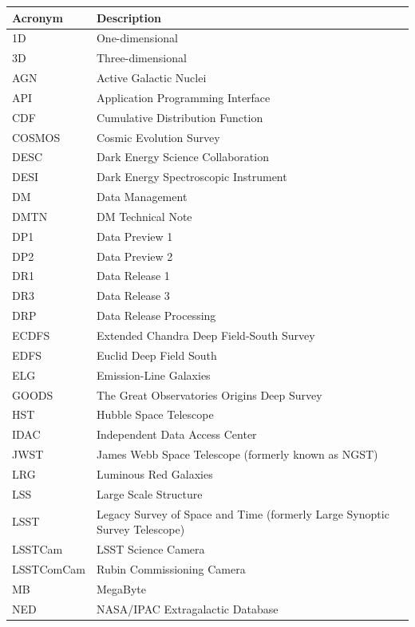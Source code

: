 \addtocounter{table}{-1}
\begin{longtable}{p{}p{}}\hline
\textbf{Acronym} & \textbf{Description}  \\\hline

1D & One-dimensional \\\hline
3D & Three-dimensional \\\hline
AGN & Active Galactic Nuclei \\\hline
API & Application Programming Interface \\\hline
CDF & Cumulative Distribution Function \\\hline
COSMOS & Cosmic Evolution Survey \\\hline
DESC & Dark Energy Science Collaboration \\\hline
DESI & Dark Energy Spectroscopic Instrument \\\hline
DM & Data Management \\\hline
DMTN & DM Technical Note \\\hline
DP1 & Data Preview 1 \\\hline
DP2 & Data Preview 2 \\\hline
DR1 & Data Release 1 \\\hline
DR3 & Data Release 3 \\\hline
DRP & Data Release Processing \\\hline
ECDFS & Extended Chandra Deep Field-South Survey \\\hline
EDFS & Euclid Deep Field South \\\hline
ELG & Emission-Line Galaxies \\\hline
GOODS & The Great Observatories Origins Deep Survey \\\hline
HST & Hubble Space Telescope \\\hline
IDAC & Independent Data Access Center \\\hline
JWST & James Webb Space Telescope (formerly known as NGST) \\\hline
LRG & Luminous Red Galaxies \\\hline
LSS & Large Scale Structure \\\hline
LSST & Legacy Survey of Space and Time (formerly Large Synoptic Survey Telescope) \\\hline
LSSTCam & LSST Science Camera \\\hline
LSSTComCam & Rubin Commissioning Camera \\\hline
MB & MegaByte \\\hline
NED & NASA/IPAC Extragalactic Database \\\hline

\end{longtable}
